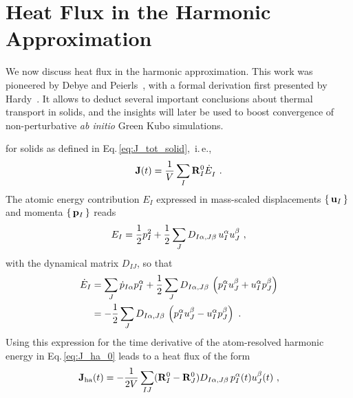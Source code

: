 
\section{Heat Flux in the Harmonic Approximation}
We now discuss heat flux in the harmonic approximation. This work was pioneered by Debye and Peierls~\cite{Debye1914,Peierls1929}, with a formal derivation first presented by Hardy~\cite{Hardy1963}. It allows to deduct several important conclusions about thermal transport in solids, and the insights will later be used to boost convergence of non-perturbative \emph{ab initio} Green Kubo simulations.

 for solids as defined in Eq.\,\eqref{eq:J_tot_solid},~i.\,e.,
\begin{align}
	\b J (t) 
		= \frac{1}{V} \sum_I \b R_I^0 \fD{\dot{E}}_I~.
		\label{eq:J_ha_0}
\end{align}
The atomic energy contribution $E_I$ expressed in mass-scaled displacements $\set{{\bf u}_I}$ and momenta $\set{{\bf p}_I}$ reads
\begin{align}
	E_I = \frac{1}{2} p_I^2 + \frac{1}{2} \sum_J D_{I \alpha , J \beta} \, u_I^\alpha u_J^\beta~,
\end{align}
with the dynamical matrix $D_{IJ}$, so that
\begin{align}
	\dot E_I 
		&= \sum_J \dot{p}_{I\alpha} p_I^\alpha 
		+ \halb \sum_J D_{I \alpha , J \beta} \, 
			\left( p_I^\alpha u_J^\beta + u_I^\alpha p_J^\beta\right) \nonumber \\ 
		&= -\halb \sum_J D_{I \alpha , J \beta} \, 
		\left( p_I^\alpha u_J^\beta - u_I^\alpha p_J^\beta\right) ~.
		\label{eq:dotE_I}
\end{align}
Using this expression for the time derivative of the atom-resolved harmonic energy  in Eq.\,\eqref{eq:J_ha_0} leads to a heat flux of the form
\begin{align}
    \b J_{\rm ha} (t) = - \frac{1}{2V} \sum_{IJ} (\b R_I^0 - \b R_J^0) D_{I \alpha, J \beta} \, p_I^\alpha (t) u_J^\beta (t)~,
   \label{eq:J_ha_r}
\end{align}
